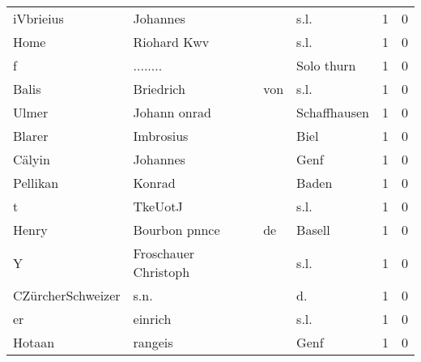 \begin{center}
\begin{tiny}
\begin{longtabu}{llllrr}
                iVbrieius &                           Johannes &             &                                        s.l. &          1 &         0 \\
                     Home &                        Riohard Kwv &             &                                        s.l. &          1 &         0 \\
                        f &                           ........ &             &                                  Solo thurn &          1 &         0 \\
                    Balis &                          Briedrich &         von &                                        s.l. &          1 &         0 \\
                    Ulmer &                       Johann onrad &             &                                Schaffhausen &          1 &         0 \\
                   Blarer &                          Imbrosius &             &                                        Biel &          1 &         0 \\
                   Cälyin &                           Johannes &             &                                        Genf &          1 &         0 \\
                 Pellikan &                             Konrad &             &                                       Baden &          1 &         0 \\
                        t &                            TkeUotJ &             &                                        s.l. &          1 &         0 \\
                    Henry &                      Bourbon pnnce &          de &                                      Basell &          1 &         0 \\
                        Y &               Froschauer Christoph &             &                                        s.l. &          1 &         0 \\
        CZürcherSchweizer &                               s.n. &             &                                         d.  &          1 &         0 \\
                       er &                            einrich &             &                                        s.l. &          1 &         0 \\
                   Hotaan &                            rangeis &             &                                        Genf &          1 &         0 \\

\end{longtabu}
\end{tiny}
\end{center}
